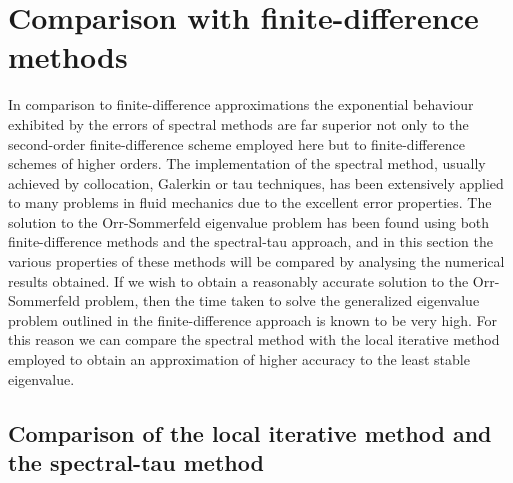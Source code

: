 \documentclass[a4paper, 12pt, twoside, openright]{article}
\numberwithin{equation}{section}
\begin{document}
\section{Comparison with finite-difference methods}
In comparison to finite-difference approximations the exponential behaviour exhibited by the errors of spectral methods are far superior not only to the second-order finite-difference scheme employed here but to finite-difference schemes of higher orders. The implementation of the spectral method, usually achieved by collocation, Galerkin or tau techniques, has been extensively applied to many problems in fluid mechanics due to the excellent error properties. The solution to the Orr-Sommerfeld eigenvalue problem has been found using both finite-difference methods and the spectral-tau approach, and in this section the various properties of these methods will be compared by analysing the numerical results obtained. If we wish to obtain a reasonably accurate solution to the Orr-Sommerfeld problem, then the time taken to solve the generalized eigenvalue problem outlined in the finite-difference approach is known to be very high. For this reason we can compare the spectral method with the local iterative method employed to obtain an approximation of higher accuracy to the least stable eigenvalue.

\subsection{Comparison of the local iterative method and the spectral-tau method}
\end{document}
